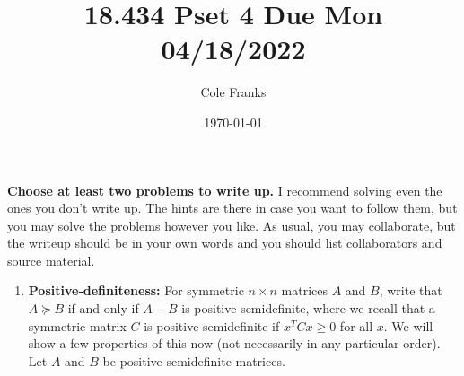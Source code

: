 \documentclass[11pt, oneside]{article}   	%
\title{18.434 Pset 4 Due Mon 04/18/2022}
\author{Cole Franks}
\date{\today}							%
\theoremstyle{definition}
\begin{document}
\maketitle
\textbf{Choose at least two problems to write up.} I recommend solving even the ones you don't write up. The hints are there in case you want to follow them, but you may solve the problems however you like. As usual, you may collaborate, but the writeup should be in your own words and you should list collaborators and source material.
\begin{enumerate}
\item \textbf{Positive-definiteness:}
 For symmetric $n\times n$ matrices $A$ and $B$, write that $A \succeq B$ if and only if $A - B$ is positive semidefinite, where we recall that a symmetric matrix $C$ is positive-semidefinite if $x^T C x \geq 0$ for all $x$. We will show a few properties of this now (not necessarily in any particular order). Let $A$ and $B$ be positive-semidefinite matrices.
 

\end{enumerate}
\end{document}
